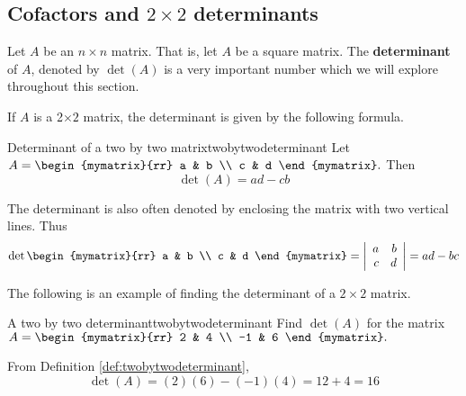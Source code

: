 \subsection{Cofactors and \texorpdfstring{$2\times 2$}{2x2} determinants}

Let $A$ be an $n\times n$ matrix. That is, let $A$ be a square matrix. The \textbf{determinant} of $A$, denoted
by $\det \left( A\right) $ is a very important number which we will explore throughout this section. 

If $A$ is a 2$\times 2$
matrix, the determinant is given by the following formula.

\begin{definition}{Determinant of a two by two matrix}{twobytwodeterminant}
Let $A=\begin{mymatrix}{rr}
a & b \\
c & d
\end{mymatrix} .$ Then
\begin{equation*}
\det \left( A\right)  = ad-cb
\end{equation*}
\end{definition}

The determinant is also often denoted by enclosing the matrix with two
vertical lines. Thus
\begin{equation*}
\det \begin{mymatrix}{rr}
a & b \\
c & d
\end{mymatrix} =\left|
\begin{array}{rr}
a & b \\
c & d
\end{array}
\right| 
=ad - bc
\end{equation*}

The following is an example of finding the determinant of a $2 \times 2$ matrix.

\begin{example}{A two by two determinant}{twobytwodeterminant}
Find $\det\left(A\right) $ for the matrix
$A =  \begin{mymatrix}{rr}
2 & 4 \\
-1 & 6
\end{mymatrix} .$
\end{example}

\begin{solution} From Definition \ref{def:twobytwodeterminant},
\begin{equation*}
\det \left( A\right) = \left( 2\right) \left( 6\right) -\left(
-1\right) \left( 4\right) = 12 + 4 = 16
\end{equation*}
\end{solution} 

